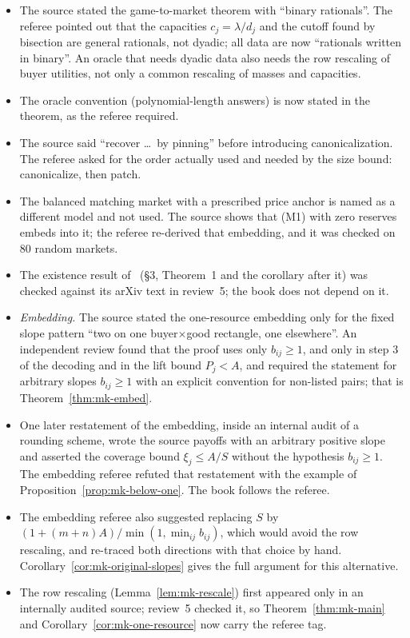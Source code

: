 \begin{itemize}[nosep]
\item The source stated the game-to-market theorem with ``binary rationals''. The referee pointed out
that the capacities $c_j=\lambda/d_j$ and the cutoff found by bisection are general rationals, not
dyadic; all data are now ``rationals written in binary''. An oracle that needs dyadic data also needs
the row rescaling of buyer utilities, not only a common rescaling of masses and capacities.
\item The oracle convention (polynomial-length answers) is now stated in the theorem, as the referee
required.
\item The source said ``recover \dots\ by pinning'' before introducing canonicalization. The referee asked
for the order actually used and needed by the size bound: canonicalize, then patch.
\item The balanced matching market with a prescribed price anchor is named as a different model and not
used. The source shows that (M1) with zero reserves embeds into it; the referee re-derived that
embedding, and it was checked on 80 random markets.
\item The existence result of~\cite{galichon25} (\S3, Theorem~1 and the corollary after it) was checked against its arXiv text in review~5; the book does not depend on it.
\item \emph{Embedding.} The source stated the one-resource embedding only for the fixed slope pattern
``two on one buyer$\times$good rectangle, one elsewhere''. An independent review found that the proof
uses only $b_{ij}\ge1$, and only in step 3 of the decoding and in the lift bound $P_j<A$, and required the
statement for arbitrary slopes $b_{ij}\ge1$ with an explicit convention for non-listed pairs; that is
Theorem~\ref{thm:mk-embed}.
\item One later restatement of the embedding, inside an internal audit of a rounding scheme, wrote the
source payoffs with an arbitrary positive slope and asserted the coverage bound $\xi_j\le A/S$ without
the hypothesis $b_{ij}\ge1$. The embedding referee refuted that restatement with the example of
Proposition~\ref{prop:mk-below-one}. The book follows the referee.
\item The embedding referee also suggested replacing $S$ by $(1+(m+n)A)/\min(1,\min_{ij}b_{ij})$, which
would avoid the row rescaling, and re-traced both directions with that choice by hand.
Corollary~\ref{cor:mk-original-slopes} gives the full argument for this alternative.
\item The row rescaling (Lemma~\ref{lem:mk-rescale}) first appeared only in an internally audited source; review~5 checked it, so Theorem~\ref{thm:mk-main} and Corollary~\ref{cor:mk-one-resource} now carry the referee tag.
\end{itemize}

